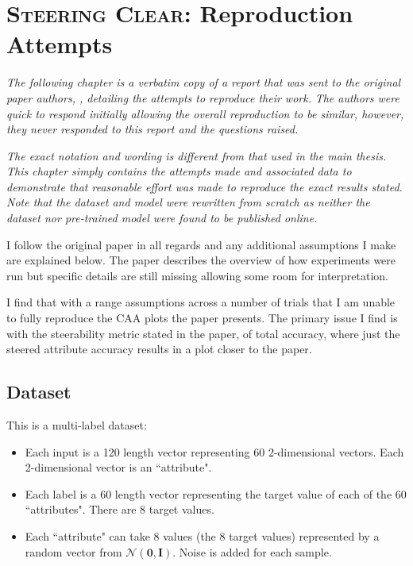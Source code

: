 \chapter{{\scshape Steering Clear}: Reproduction Attempts}
\label{app:steering-clear}

\emph{The following chapter is a verbatim copy of a report that was sent to the original paper authors, \citet{steering-clear}, detailing the attempts to reproduce their work.}
\emph{The authors were quick to respond initially allowing the overall reproduction to be similar, however, they never responded to this report and the questions raised.}

\emph{The exact notation and wording is different from that used in the main thesis.}
\emph{This chapter simply contains the attempts made and associated data to demonstrate that reasonable effort was made to reproduce the exact results stated.}
\emph{Note that the dataset and model were rewritten from scratch as neither the dataset nor pre-trained model were found to be published online.}

I follow the original paper \cite{steering-clear} in all regards and any additional assumptions I make are explained below.
The paper describes the overview of how experiments were run but specific details are still missing allowing some room for interpretation.

I find that with a range assumptions across a number of trials that I am unable to fully reproduce the CAA plots the paper presents.
The primary issue I find is with the steerability metric stated in the paper, of total accuracy, where just the steered attribute accuracy results in a plot closer to the paper.

\section{Dataset}

This is a multi-label dataset:
\begin{itemize}[nolistsep]
    \item Each input is a 120 length vector representing 60 2-dimensional vectors. Each 2-dimensional vector is an ``attribute".
    \item Each label is a 60 length vector representing the target value of each of the 60 ``attributes". There are 8 target values.
    \item Each ``attribute" can take 8 values (the 8 target values) represented by a random vector from $\mathcal{N}(\mathbf{0}, \mathbf{I})$. Noise is added for each sample.
\end{itemize}

